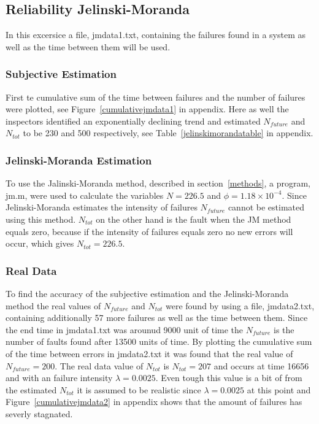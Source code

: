 \subsection{Reliability Jelinski-Moranda}
In this excersice a file, jmdata1.txt, containing the failures found in a system as well as the time between them will be used.

\subsubsection*{Subjective Estimation} 
First te cumulative sum of the time between failures and the number of failures were plotted, see Figure~\ref{cumulativejmdata1} in appendix. Here as well the inspectors identified an exponentially declining trend and estimated $N_{future}$ and $N_{tot}$ to be 230 and 500 respectively, see Table~\ref{jelinskimorandatable} in appendix.

\subsubsection*{Jelinski-Moranda Estimation}
To use the Jalinski-Moranda method, described in section~\ref{methods}, a program, jm.m, were used to calculate the variables $N=226.5$ and $\phi=1.18\times10^{-4}$. Since Jelinski-Moranda estimates the intensity of failures $N_{future}$ cannot be estimated using this method.
$N_{tot}$ on the other hand is the fault when the JM method equals zero, because if the intensity of failures equals zero no new errors will occur, which gives $N_{tot}=226.5$.

\subsubsection*{Real Data}
To find the accuracy of the subjective estimation and the Jelinski-Moranda method the real values of $N_{future}$ and $N_{tot}$ were found by using a file, jmdata2.txt, containing additionally 57 more failures as well as the time between them. Since the end time in jmdata1.txt was arounud 9000 unit of time the $N_{future}$ is the number of faults found after 13500 units of time. By plotting the cumulative sum of the time between errors in jmdata2.txt it was found that the real value of $N_{future}=200$. The real data value of $N_{tot}$ is $N_{tot}=207$ and occurs at time 16656 and with an failure intensity $\lambda=0.0025$. Even tough this value is a bit of from the estimated $N_{tot}$ it is assumed to be realistic since $\lambda=0.0025$ at this point and Figure~\ref{cumulativejmdata2} in appendix shows that the amount of failures has severly stagnated.

